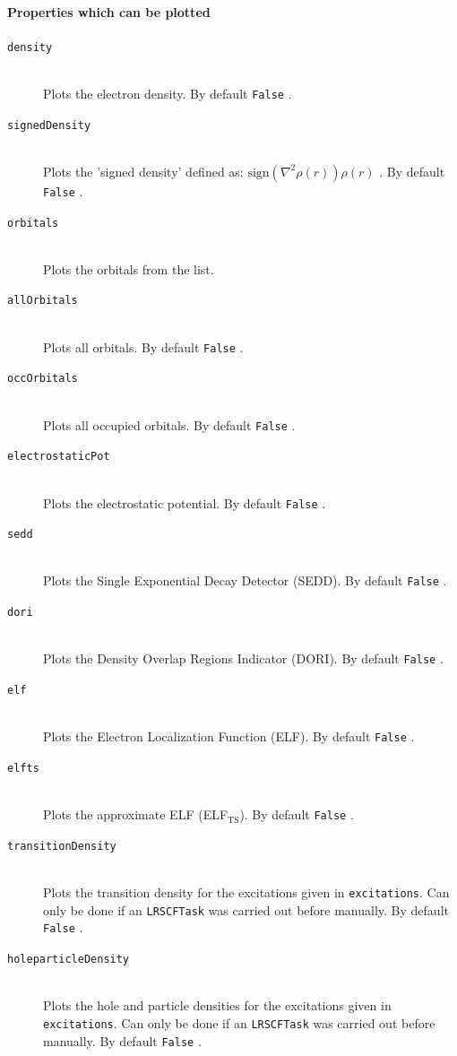 \documentclass[bibliography=totocnumbered,a4paper,10pt,oneside]{scrbook}
\newcommand{\ttt}[1]{%
  \begingroup\setlength{\fboxsep}{1pt}%
  \colorbox{serenity-green!30}{\texttt{\hspace*{2pt}\vphantom{(g}#1\hspace*{2pt}}}%
  \endgroup
}
\begin{document}
\paragraph{Properties which can be plotted}
\begin{description}
    \item [\texttt{density}]\hfill \\
    Plots the electron density. By default \ttt{False}.
    \item [\texttt{signedDensity}]\hfill \\
    Plots the 'signed density' defined as: $\mathrm{sign}(\nabla^2\rho(r))\rho(r)$ . By default \ttt{False}.
    \item [\texttt{orbitals}]\hfill \\
    Plots the orbitals from the list.
    \item [\texttt{allOrbitals}]\hfill \\
    Plots all orbitals. By default \ttt{False}.
    \item [\texttt{occOrbitals}]\hfill \\
    Plots all occupied orbitals. By default \ttt{False}.
    \item [\texttt{electrostaticPot}]\hfill \\
    Plots the electrostatic potential. By default \ttt{False}.
    \item [\texttt{sedd}]\hfill \\
    Plots the Single Exponential Decay Detector (SEDD). By default \ttt{False}.
    \item [\texttt{dori}]\hfill \\
    Plots the Density Overlap Regions Indicator (DORI). By default \ttt{False}.
    \item [\texttt{elf}]\hfill \\
    Plots the Electron Localization Function (ELF). By default \ttt{False}.
    \item [\texttt{elfts}]\hfill \\
    Plots the approximate ELF (ELF$_\text{TS}$). By default \ttt{False}.
    \item [\texttt{transitionDensity}]\hfill \\
    Plots the transition density for the excitations given in \texttt{excitations}. Can only be done if an \texttt{LRSCFTask} was carried out before manually. By default \ttt{False}.
    \item [\texttt{holeparticleDensity}]\hfill \\
    Plots the hole and particle densities for the excitations given in \texttt{excitations}. Can only be done if an \texttt{LRSCFTask} was carried out before manually. By default \ttt{False}.

\end{description}
\end{document}
